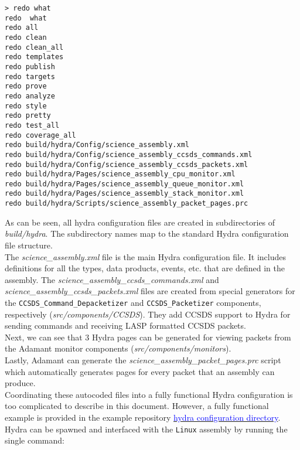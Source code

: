 \vspace{5mm} %
\begin{verbatim}
> redo what
redo  what
redo all
redo clean
redo clean_all
redo templates
redo publish
redo targets
redo prove
redo analyze
redo style
redo pretty
redo test_all
redo coverage_all
redo build/hydra/Config/science_assembly.xml
redo build/hydra/Config/science_assembly_ccsds_commands.xml
redo build/hydra/Config/science_assembly_ccsds_packets.xml
redo build/hydra/Pages/science_assembly_cpu_monitor.xml
redo build/hydra/Pages/science_assembly_queue_monitor.xml
redo build/hydra/Pages/science_assembly_stack_monitor.xml
redo build/hydra/Scripts/science_assembly_packet_pages.prc
\end{verbatim}
\vspace{5mm} %

As can be seen, all hydra configuration files are created in subdirectories of \textit{build/hydra}. The subdirectory names map to the standard Hydra configuration file structure. \\

The \textit{science\_assembly.xml} file is the main Hydra configuration file. It includes definitions for all the types, data products, events, etc. that are defined in the assembly. The \textit{science\_assembly\_ccsds\_commands.xml} and \textit{science\_assembly\_ccsds\_packets.xml} files are created from special generators for the \texttt{CCSDS\_Command\_Depacketizer} and \texttt{CCSDS\_Packetizer} components, respectively (\textit{src/components/CCSDS}). They add CCSDS support to Hydra for sending commands and receiving LASP formatted CCSDS packets. \\

Next, we can see that 3 Hydra pages can be generated for viewing packets from the Adamant monitor components (\textit{src/components/monitors}). \\

Lastly, Adamant can generate the \textit{science\_assembly\_packet\_pages.prc} script which automatically generates pages for every packet that an assembly can produce. \\

Coordinating these autocoded files into a fully functional Hydra configuration is too complicated to describe in this document. However, a fully functional example is provided in the example repository \href{https://github.com/lasp/adamant_example/tree/main/src/assembly/linux/main/hydra}{\textcolor{blue}{hydra configuration directory}}. Hydra can be spawned and interfaced with the \texttt{Linux} assembly by running the single command:

